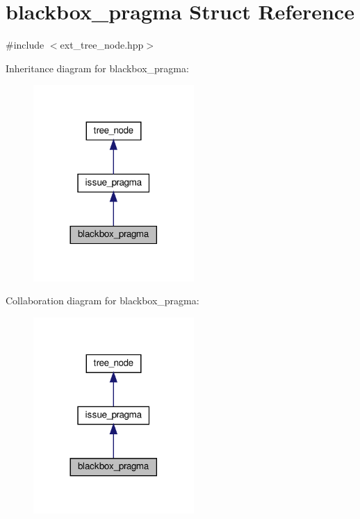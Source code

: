 \hypertarget{structblackbox__pragma}{}\section{blackbox\+\_\+pragma Struct Reference}
\label{structblackbox__pragma}


{\ttfamily \#include $<$ext\+\_\+tree\+\_\+node.\+hpp$>$}



Inheritance diagram for blackbox\+\_\+pragma\+:
\nopagebreak
\begin{figure}[H]
\begin{center}
\leavevmode
\includegraphics[width=173pt]{d8/d0c/structblackbox__pragma__inherit__graph}
\end{center}
\end{figure}


Collaboration diagram for blackbox\+\_\+pragma\+:
\nopagebreak
\begin{figure}[H]
\begin{center}
\leavevmode
\includegraphics[width=173pt]{df/dc9/structblackbox__pragma__coll__graph}
\end{center}
\end{figure}
